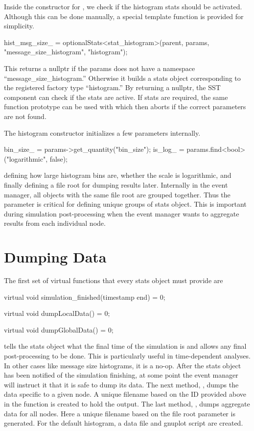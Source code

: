 Inside the constructor for , we check if the histogram stats should be activated.
Although this can be done manually, a special template function is provided for simplicity.


\begin{CppCode}
hist_msg_size_ = optionalStats<stat_histogram>(parent,
        params, "message_size_histogram", "histogram");
\end{CppCode}
This returns a nullptr if the params does not have a namespace ``message\_size\_histogram.''  Otherwise it builds a stats object corresponding to the registered factory type ``histogram.'' By returning a nullptr, the SST component can check if the stats are active.  If stats are required, the same function prototype can be used with  which then aborts if the correct parameters are not found. 

The histogram constructor initializes a few parameters internally.

\begin{CppCode}
bin_size_ = params->get_quantity("bin_size");
is_log_ = params.find<bool>("logarithmic", false);
\end{CppCode}
defining how large histogram bins are, whether the scale is logarithmic, and finally defining a file root for dumping results later.
Internally in the event manager, all objects with the same file root are grouped together.
Thus the  parameter is critical for defining unique groups of stats object.
This is important during simulation post-processing when the event manager wants to aggregate results from each individual node.

\section{Dumping Data}\label{sec:dumping}
The first set of virtual functions that every stats object must provide are

\begin{CppCode}
virtual void simulation_finished(timestamp end) = 0;

virtual void dumpLocalData() = 0;

virtual void dumpGlobalData() = 0;
\end{CppCode}

 tells the stats object what the final time of the simulation is and allows any final post-processing to be done.
This is particularly useful in time-dependent analyses.  In other cases like message size histograms, it is a no-op.
After the stats object has been notified of the simulation finishing, at some point the event manager will instruct it that it is safe to dump its data.
The next method, , dumps the data specific to a given node.
A unique filename based on the ID provided above in the  function is created to hold the output.
The last method, , dumps aggregate data for all nodes.
Here a unique filename based on the file root parameter is generated.
For the default histogram, a data file and gnuplot script are created.

